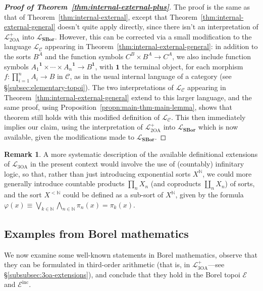 \documentclass[11pt]{amsart}
\newcommand\cC{\mathcal{C}}
\newcommand\cE{\mathcal{E}}
\newcommand\cL{\mathcal{L}}
\newcommand\inc{\mathrm{inc}}
\newcommand{\N}{\mathbb{N}}
\renewcommand\phi{\varphi}
\newcommand\SBor{\mathbf{SBor}}
\newcommand\SOA{{2\mathrm{OA}}}
\newcommand\tm{\mathbf{1}}
\newcommand\TOA{{3\mathrm{OA}}}
\theoremstyle{definition}
\newtheorem{rmk}[defn]{Remark}
\theoremstyle{remark}
\theoremstyle{plain}
\begin{document}
\begin{proof}[\textbf{\textup{Proof of Theorem~\ref{thm:internal-external-plus}}}]
  The proof is the same as that of Theorem~\ref{thm:internal-external}, except that Theorem~\ref{thm:internal-external-general} doesn't quite apply directly, since there isn't an interpretation of \( \cL_{\SOA}^+ \) into \( \cL_{\SBor} \).
  However, this can be corrected via a small modification to the language \( \cL_{\cC} \) appearing in Theorem~\ref{thm:internal-external-general}: in addition to the sorts \( B^A \) and the function symbols \( C^B \times B^A \to C^A \), we also include function symbols \( {A_1}^\tm \times \cdots \times {A_n}^\tm \to B^\tm \), with \( \tm \) the terminal object, for each morphism \( f \colon \prod_{i=1}^n A_i \to B \) in \( \cC \), as in the usual internal language of a category (see \S\ref{subsec:elementary-topoi}).
  The two interpretations of \( \cL_{\cC} \) appearing in Theorem~\ref{thm:internal-external-general} extend to this larger language, and the same proof, using Proposition~\ref{propn:main-thm-main-lemma}, shows that theorem still holds with this modified definition of \( \cL_{\cC} \).
  This then immediately implies our claim, using the interpretation of \( \cL_{\SOA}^+ \) into \( \cL_{\SBor} \) which is now available, given the modifications made to \( \cL_{\SBor} \).
\end{proof}

\begin{rmk} \label{rmk:infinitary-extensions}
  A more systematic description of the available definitional extensions of \( \cL_{\TOA} \) in the present context would involve the use of (countably) infinitary logic, so that, rather than just introducing exponential sorts \( X^\N \), we could more generally introduce countable products \( \prod_n X_n \) (and coproducts \( \coprod_n X_n \)) of sorts, and the sort \( X^{<\N} \) could be defined as a sub-sort of  \( X^\N \), given by the formula \( \phi(x) \equiv \bigvee_{k \in \N} \bigwedge_{n \in \N} \pi_n(x) = \pi_k(x) \).
\end{rmk}

\subsection{Examples from Borel mathematics} \label{subsec:borel-examples}
We now examine some well-known statements in Borel mathematics, observe that they can be formulated in third-order arithmetic (that is, in \( \cL_{\TOA}^+ \)---see \S\ref{subsubsec:3oa-extensions}), and conclude that they hold in the Borel topoi \( \cE \) and \( \cE^\inc \).
\end{document}
